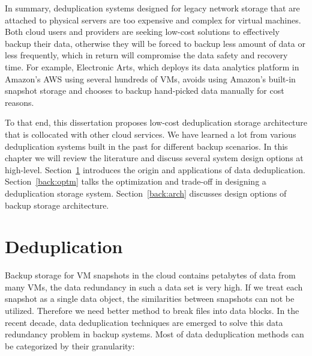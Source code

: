 In summary, deduplication systems designed for legacy network storage that are attached to
physical servers are too expensive and complex for virtual machines. 
Both cloud users and providers are seeking low-cost solutions to effectively backup
their data, otherwise they will be forced to backup less amount of data or less frequently,
which in return will compromise the data safety and recovery time. For example, Electronic Arts, which deploys
its data analytics platform in Amazon's AWS using several hundreds of VMs, 
avoids using Amazon's built-in snapshot storage and chooses to backup hand-picked data manually for cost reasons.

To that end, this dissertation proposes low-cost deduplication storage architecture that is
collocated with other cloud services. We have learned a lot from 
various deduplication systems built in the past for different backup scenarios. 
In this chapter we will review the literature and discuss several system design options at high-level.
Section~\ref{back:dedup} introduces the origin and applications of data deduplication.
Section~\ref{back:optm} talks the optimization and trade-off in designing a deduplication storage system.
Section~\ref{back:arch} discusses design options of backup storage architecture.

\section{Deduplication}
\label{back:dedup}
Backup storage for VM snapshots in the cloud contains petabytes of data from many VMs,
the data redundancy in such a data set is very high\cite{Jayaram2011, agrawal07}.
If we treat each snapshot as a single data object, the similarities between snapshots
can not be utilized. Therefore we need better method to break files into data blocks.
In the recent decade, data deduplication techniques are emerged to solve this data
redundancy problem in backup systems.
Most of data deduplication methods can be categorized by their granularity:

